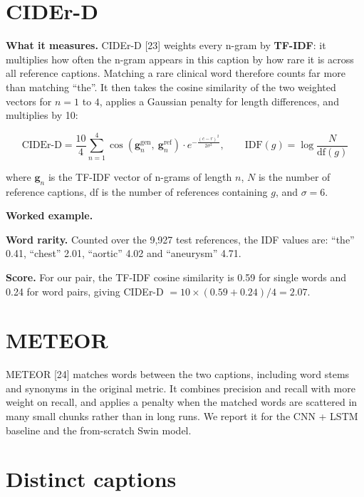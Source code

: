 \section{CIDEr-D}

\textbf{What it measures.} CIDEr-D {[}23{]} weights every n-gram by \textbf{TF-IDF}: it multiplies how often the n-gram appears in this caption by how rare it is across all reference captions. Matching a rare clinical word therefore counts far more than matching ``the''. It then takes the cosine similarity of the two weighted vectors for \(n = 1\) to \(4\), applies a Gaussian penalty for length differences, and multiplies by 10:

\[\text{CIDEr-D} = \frac{10}{4}\sum_{n=1}^{4} \cos\left(\boldsymbol{g}_n^{\text{gen}},\ \boldsymbol{g}_n^{\text{ref}}\right) \cdot e^{-\frac{(c - r)^2}{2\sigma^2}}, \qquad \text{IDF}(g) = \log\frac{N}{\text{df}(g)} \tag{5.3}\]

where \(\boldsymbol{g}_n\) is the TF-IDF vector of n-grams of length \(n\), \(N\) is the number of reference captions, df is the number of references containing \(g\), and \(\sigma = 6\).

\begin{examplebox}

\textbf{Worked example.}

\textbf{Word rarity.} Counted over the 9,927 test references, the IDF values are: ``the'' 0.41, ``chest'' 2.01, ``aortic'' 4.02 and ``aneurysm'' 4.71.

\textbf{Score.} For our pair, the TF-IDF cosine similarity is 0.59 for single words and 0.24 for word pairs, giving CIDEr-D \(= 10 \times (0.59 + 0.24)/4 = 2.07\).

\end{examplebox}

\section{METEOR}

METEOR {[}24{]} matches words between the two captions, including word stems and synonyms in the original metric. It combines precision and recall with more weight on recall, and applies a penalty when the matched words are scattered in many small chunks rather than in long runs. We report it for the CNN + LSTM baseline and the from-scratch Swin model.

\section{Distinct captions}

